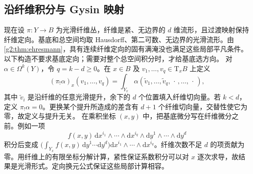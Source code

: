 \subsection{沿纤维积分与 Gysin 映射}
\label{g2:subsec:2004:04}
现在设 \(\pi:Y\to B\) 为光滑纤维丛，纤维是紧、无边界的 \(d\) 维流形，且过渡映射保持纤维定向。基底和总空间均取 Hausdorff、第二可数、无边界的光滑流形。由\cref{g2:thm:ehresmann}，具有连续纤维定向的固有满淹没也满足这些局部平凡条件。以下构造不要求基底定向；需要对整个总空间积分时，才给基底选方向。
\ProseParagraphBreak
对 \(\alpha\in\Omega^k(Y)\)，令 \(q=k-d\ge0\)。在 \(x\in B\) 及 \(v_1,\ldots,v_q\in\mathrm T_xB\) 上定义
\begin{equation}\label{g2:eq:fiber-integration-definition}
	(\pi_!\alpha)_x(v_1,\ldots,v_q)
	=\int_{Y_x}\alpha(\widetilde v_1,\ldots,\widetilde v_q,\,\cdot\,,\ldots,\,\cdot\,),
\end{equation}
其中 \(\widetilde v_i\) 是沿纤维的任意光滑提升，余下的 \(d\) 个位置填入纤维切向量。若 \(k<d\)，定义 \(\pi_!\alpha=0\)。更换某个提升所造成的差含有 \(d+1\) 个纤维切向量，交替性使它为零，故定义与提升无关。
\ProseParagraphBreak
在乘积坐标 \((x,y)\) 中，把基底微分写在纤维微分之前。例如一项
\[
	f(x,y)\,\mathrm dx^{i_1}\wedge\cdots\wedge\mathrm dx^{i_q}\wedge\mathrm dy^1\wedge\cdots\wedge\mathrm dy^d
\]
积分后变成 \(\bigl(\int_{Y_x}f(x,y)\,\mathrm dy^1\cdots\mathrm dy^d\bigr)\mathrm dx^{i_1}\wedge\cdots\wedge\mathrm dx^{i_q}\)。纤维次数不足 \(d\) 的项贡献为零。用纤维上的有限坐标分解计算，紧性保证系数积分可以对 \(x\) 逐次求导，故结果是光滑形式。定向换元公式保证这些局部计算相容。

